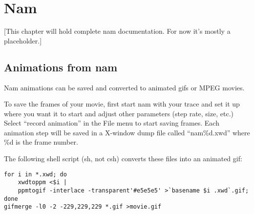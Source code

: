 
\chapter{Nam}
	\label{chap:nam}

[This chapter will hold complete nam documentation.
For now it's mostly a placeholder.]

%
% 

\section{Animations from nam}

Nam animations can be saved and converted to animated gifs or MPEG movies.

To save the frames of your movie, first
  start nam with your trace and set it up where you want it to start
  and adjust other parameters (step rate, size, etc.)
Select ``record animation'' in the File menu to start saving frames.
Each animation step will be saved in a X-window dump file called ``nam\%d.xwd''
  where \%d is the frame number.

The following shell script (sh, not csh)
  converts these files into an animated gif:
\begin{verbatim}
for i in *.xwd; do
	xwdtoppm <$i |
	ppmtogif -interlace -transparent'#e5e5e5' >`basename $i .xwd`.gif;
done
gifmerge -l0 -2 -229,229,229 *.gif >movie.gif
\end{verbatim}

